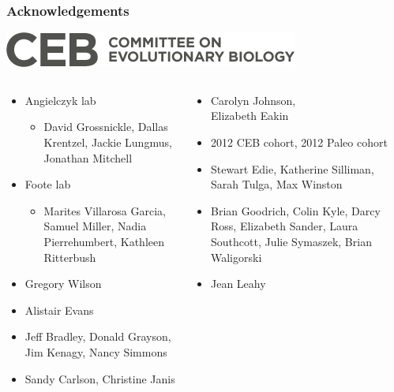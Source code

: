 \documentclass{beamer}
\begin{document}
\begin{frame}
  \frametitle{Acknowledgements}
  \begin{center}
    \includegraphics[width=\textwidth,height=0.1\textheight,keepaspectratio=true]{figure/ceb}
  \end{center}

  \begin{columns}
    \begin{column}{0.35\textwidth}
      \begin{itemize}
        \item \tiny{Angielczyk lab}
          \begin{itemize}
            \item \tiny{David Grossnickle, Dallas Krentzel, Jackie Lungmus, Jonathan Mitchell}
          \end{itemize}
        \item \tiny{Foote lab}
          \begin{itemize}
            \item \tiny{Marites Villarosa Garcia, Samuel Miller, Nadia Pierrehumbert, Kathleen Ritterbush}
          \end{itemize}
        \item \tiny{Gregory Wilson}
        \item \tiny{Alistair Evans}
        \item \tiny{Jeff Bradley, Donald Grayson, Jim Kenagy, Nancy Simmons}
        \item \tiny{Sandy Carlson, Christine Janis}
      \end{itemize}
    \end{column}
    \begin{column}{0.35\textwidth}
      \begin{itemize}
        \item \tiny{Carolyn Johnson, \\Elizabeth Eakin}
        \item \tiny{2012 CEB cohort, 2012 Paleo cohort}
        \item \tiny{\alert{Stewart Edie}, Katherine Silliman, Sarah Tulga, Max Winston}
        \item \tiny{Brian Goodrich, Colin Kyle, \alert{Darcy Ross}, Elizabeth Sander, Laura Southcott, \alert{Julie Symaszek}, Brian Waligorski}
        \item \tiny{Jean Leahy}

\end{itemize}
\end{column}
\end{columns}
\end{frame}
\end{document}
